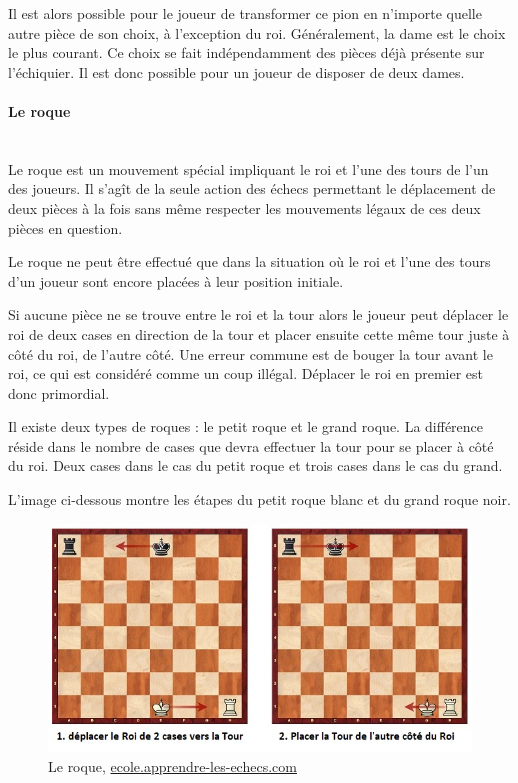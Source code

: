 \huge\documentclass{article}
\begin{document}
Il est alors possible pour le joueur de transformer ce pion en n'importe quelle autre pièce de son choix, à l'exception du roi. Généralement, la dame est le choix le plus courant. Ce choix se fait indépendamment des pièces déjà présente sur l'échiquier. Il est donc possible pour un joueur de disposer de deux dames.

\paragraph{Le roque}
~~\\

Le roque est un mouvement spécial impliquant le roi et l'une des tours de l'un des joueurs. Il s'agît de la seule action des échecs permettant le déplacement de deux pièces à la fois sans même respecter les mouvements légaux de ces deux pièces en question.

Le roque ne peut être effectué que dans la situation où le roi et l'une des tours d'un joueur sont encore placées à leur position initiale.

Si aucune pièce ne se trouve entre le roi et la tour alors le joueur peut déplacer le roi de deux cases en direction de la tour et placer ensuite cette même tour juste à côté du roi, de l'autre côté. Une erreur commune est de bouger la tour avant le roi, ce qui est considéré comme un coup illégal. Déplacer le roi en premier est donc primordial.

Il existe deux types de roques : le petit roque et le grand roque. La différence réside dans le nombre de cases que devra effectuer la tour pour se placer à côté du roi. Deux cases dans le cas du petit roque et trois cases dans le cas du grand.

L'image ci-dessous montre les étapes du petit roque blanc et du grand roque noir.

\begin{figure}[h]
\centering
\includegraphics[scale=0.8]{img/roque.jpg}
\caption{Le roque,
\href{https://ecole.apprendre-les-echecs.com/roque/}{ecole.apprendre-les-echecs.com}}
\end{figure}
\end{document}
